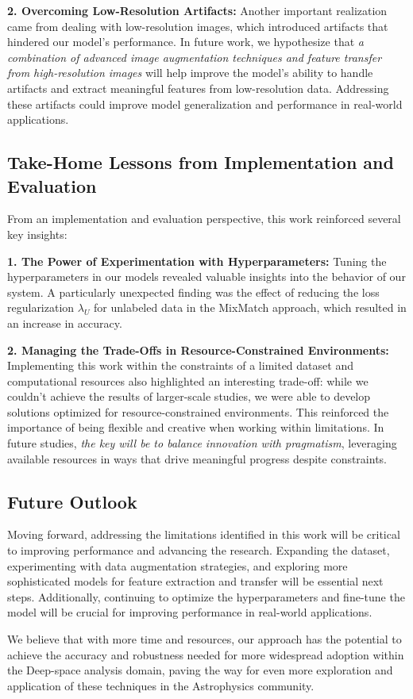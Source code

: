 \documentclass{article}
\begin{document}
\textbf{2. Overcoming Low-Resolution Artifacts:}  
Another important realization came from dealing with low-resolution images, which introduced artifacts that hindered our model’s performance. In future work, we hypothesize that \textit{a combination of advanced image augmentation techniques and feature transfer from high-resolution images} will help improve the model’s ability to handle artifacts and extract meaningful features from low-resolution data. Addressing these artifacts could improve model generalization and performance in real-world applications.

\subsection{Take-Home Lessons from Implementation and Evaluation}

From an implementation and evaluation perspective, this work reinforced several key insights: 

\textbf{1. The Power of Experimentation with Hyperparameters:}  
Tuning the hyperparameters in our models revealed valuable insights into the behavior of our system. A particularly unexpected finding was the effect of reducing the loss regularization \(\lambda_U\) for unlabeled data in the MixMatch approach, which resulted in an increase in accuracy.

\textbf{2. Managing the Trade-Offs in Resource-Constrained Environments:}  
Implementing this work within the constraints of a limited dataset and computational resources also highlighted an interesting trade-off: while we couldn't achieve the results of larger-scale studies, we were able to develop solutions optimized for resource-constrained environments. This reinforced the importance of being flexible and creative when working within limitations. In future studies, \textit{the key will be to balance innovation with pragmatism}, leveraging available resources in ways that drive meaningful progress despite constraints.

\subsection{Future Outlook}

Moving forward, addressing the limitations identified in this work will be critical to improving performance and advancing the research. Expanding the dataset, experimenting with data augmentation strategies, and exploring more sophisticated models for feature extraction and transfer will be essential next steps. Additionally, continuing to optimize the hyperparameters and fine-tune the model will be crucial for improving performance in real-world applications.

We believe that with more time and resources, our approach has the potential to achieve the accuracy and robustness needed for more widespread adoption within the Deep-space analysis domain, paving the way for even more exploration and application of these techniques in the Astrophysics community.

\newpage

\end{document}
